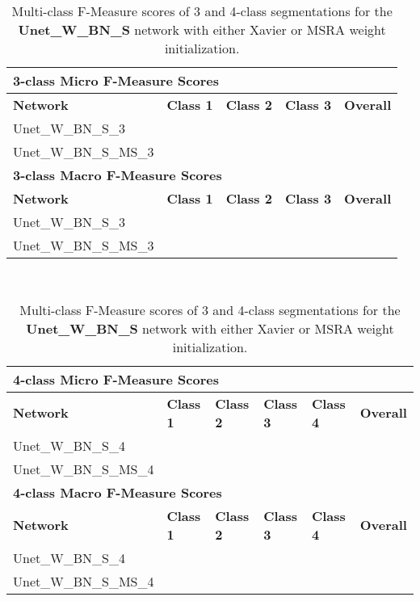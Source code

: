 \begin {table}
	\begin{flushleft}
		\begin {tabular}[!ht]{|l|l|l|l|l|}
			\hline\multicolumn{5}{|l|}{\textbf{3-class Micro F-Measure Scores}} \\ \hline
			\textbf{Network}& \textbf{Class 1}& \textbf{Class 2}& \textbf{Class 3}& \textbf{Overall} \\ \hline
			Unet\_W\_BN\_S\_3& &  & & \\ \hline
			Unet\_W\_BN\_S\_MS\_3& &  & & \\ \hline
			\multicolumn{5}{|l|}{\textbf{3-class Macro F-Measure Scores}} \\ \hline
			\textbf{Network}& \textbf{Class 1}& \textbf{Class 2}& \textbf{Class 3}& \textbf{Overall} \\ \hline
			Unet\_W\_BN\_S\_3& & & & \\ \hline
			Unet\_W\_BN\_S\_MS\_3& & & & \\ \hline
		\end {tabular}
		\vspace{0.5cm}\\
		\begin {tabular}[!ht]{|l|l|l|l|l|l|}
			\hline\multicolumn{6}{|l|}{\textbf{4-class Micro F-Measure Scores}} \\ \hline
			\textbf{Network}& \textbf{Class 1}& \textbf{Class 2}& \textbf{Class 3}& \textbf{Class 4}& \textbf{Overall} \\ \hline
			Unet\_W\_BN\_S\_4& & & & & \\ \hline
			Unet\_W\_BN\_S\_MS\_4& & & & & \\ \hline
			\multicolumn{6}{|l|}{\textbf{4-class Macro F-Measure Scores}} \\ \hline
			\textbf{Network}& \textbf{Class 1}& \textbf{Class 2}& \textbf{Class 3}& \textbf{Class 4}& \textbf{Overall} \\ \hline
			Unet\_W\_BN\_S\_4& & & & & \\ \hline
			Unet\_W\_BN\_S\_MS\_4& & & & & \\ \hline
		\end {tabular}
	\end {flushleft}
\caption[Multi-class F-Measure scores for networks with Xavier and MSRA weight initialization.]{Multi-class F-Measure scores of 3 and 4-class segmentations for  the \textbf{Unet\_W\_BN\_S} network with either Xavier or MSRA weight initialization.}
\label{tab:results4}
\end {table}

